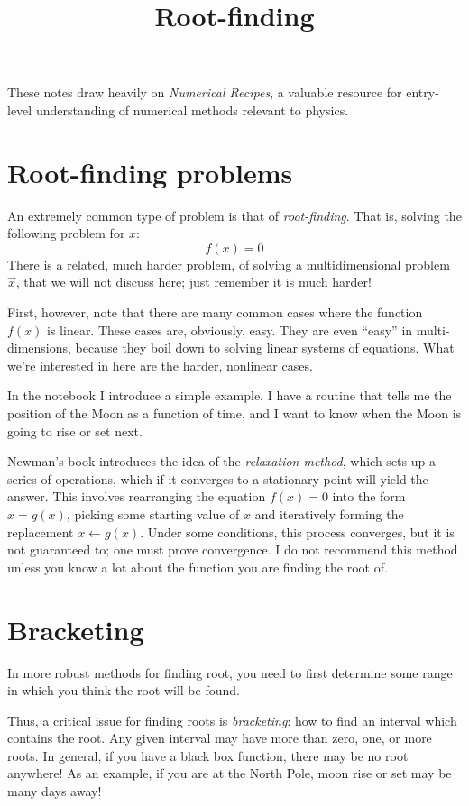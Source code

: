 \title{Root-finding}

These notes draw heavily on {\it Numerical Recipes}, a valuable
resource for entry-level understanding of numerical methods relevant
to physics.

\section{Root-finding problems}

An extremely common type of problem is that of {\it
  root-finding}. That is, solving the following problem for $x$:
\begin{equation}
f(x) = 0
\end{equation}
There is a related, much harder problem, of solving a multidimensional
problem $\vec{x}$, that we will not discuss here; just remember it is
much harder!

First, however, note that there are many common cases where the
function $f(x)$ is linear. These cases are, obviously, easy. They are
even ``easy'' in multi-dimensions, because they boil down to solving
linear systems of equations. What we're interested in here are the
harder, nonlinear cases.

In the notebook I introduce a simple example. I have a routine that
tells me the position of the Moon as a function of time, and I want to
know when the Moon is going to rise or set next.

Newman's book introduces the idea of the {\it relaxation method},
which sets up a series of operations, which if it converges to a
stationary point will yield the answer. This involves rearranging the
equation $f(x)=0$ into the form $x=g(x)$, picking some starting value
of $x$ and iteratively forming the replacement $x\leftarrow
g(x)$. Under some conditions, this process converges, but it is not
guaranteed to; one must prove convergence. I do not recommend this
method unless you know a lot about the function you are finding the
root of.

\section{Bracketing}

In more robust methods for finding root, you need to first determine
some range in which you think the root will be found.

Thus, a critical issue for finding roots is {\it bracketing}: how to
find an interval which contains the root. Any given interval may have
more than zero, one, or more roots. In general, if you have a black
box function, there may be no root anywhere! As an example, if you are
at the North Pole, moon rise or set may be many days away!

